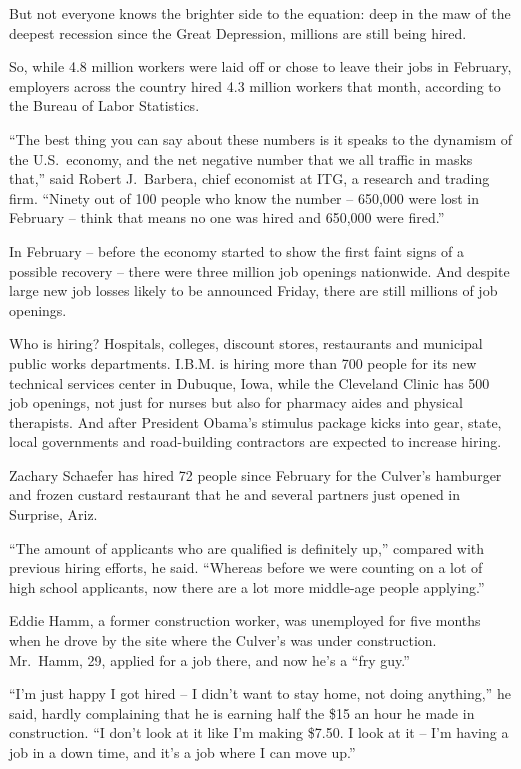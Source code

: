 \documentclass[12pt,a4paper,onecolumn]{article}
\begin{document}
But not everyone knows the brighter side to the equation: deep in the maw of the deepest recession
since the Great Depression, millions are still being hired.

So, while 4.8 million workers were laid off or chose to leave their jobs in February, employers
across the country hired 4.3 million workers that month, according to the Bureau of Labor
Statistics.

``The best thing you can say about these numbers is it speaks to the dynamism of the U.S.~economy,
and the net negative number that we all traffic in masks that,'' said Robert J.~Barbera, chief
economist at ITG, a research and trading firm. ``Ninety out of 100 people who know the number --
650,000 were lost in February -- think that means no one was hired and 650,000 were fired.''

In February -- before the economy started to show the first faint signs of a possible recovery --
there were three million job openings nationwide. And despite large new job losses likely to be
announced Friday, there are still millions of job openings.

Who is hiring? Hospitals, colleges, discount stores, restaurants and municipal public works
departments. I.B.M. is hiring more than 700 people for its new technical services center in Dubuque,
Iowa, while the Cleveland Clinic has 500 job openings, not just for nurses but also for pharmacy
aides and physical therapists. And after President Obama's stimulus package kicks into gear, state,
local governments and road-building contractors are expected to increase hiring.

Zachary Schaefer has hired 72 people since February for the Culver's hamburger and frozen custard
restaurant that he and several partners just opened in Surprise, Ariz.

``The amount of applicants who are qualified is definitely up,'' compared with previous hiring
efforts, he said. ``Whereas before we were counting on a lot of high school applicants, now there
are a lot more middle-age people applying.''

Eddie Hamm, a former construction worker, was unemployed for five months when he drove by the site
where the Culver's was under construction. Mr.~Hamm, 29, applied for a job there, and now he's a
``fry guy.''

``I'm just happy I got hired -- I didn't want to stay home, not doing anything,'' he said, hardly
complaining that he is earning half the \$15 an hour he made in construction. ``I don't look at it
like I'm making \$7.50. I look at it -- I'm having a job in a down time, and it's a job where I can
move up.''
\end{document}
